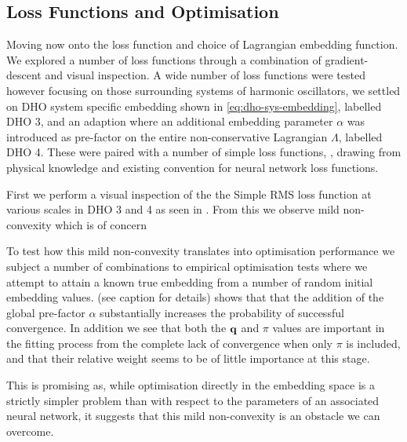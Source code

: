 \subsection{Loss Functions and Optimisation}
\label{sec:res-lf}

Moving now onto the loss function and choice of Lagrangian embedding function. We explored a number of loss functions through a combination of gradient-descent and visual inspection. A wide number of loss functions were tested however focusing on those surrounding systems of harmonic oscillators, we settled on DHO system specific embedding shown in \eqref{eq:dho-sys-embedding}, labelled DHO 3, and an adaption where an additional embedding parameter $\alpha$ was introduced as pre-factor on the entire non-conservative Lagrangian $\Lambda$, labelled DHO 4. These were paired with a number of simple loss functions, , drawing from physical knowledge and existing convention for neural network loss functions.

First we perform a visual inspection of the the Simple RMS loss function at various scales in DHO 3 and 4 as seen in . From this we observe mild non-convexity which is of concern

To test how this mild non-convexity translates into optimisation performance we subject a number of combinations to empirical optimisation tests where we attempt to attain a known true embedding from a number of random initial embedding values.  (see caption for details) shows that that the addition of the global pre-factor $\alpha$ substantially increases the probability of successful convergence.  In addition we see that both the $\vb{q}$ and $\pi$ values are important in the fitting process from the complete lack of convergence when only $\pi$ is included, and that their relative weight seems to be of little importance at this stage.

This is promising as, while optimisation directly in the embedding space is a strictly simpler problem than with respect to the parameters of an associated neural network, it suggests that this mild non-convexity is an obstacle we can overcome.

